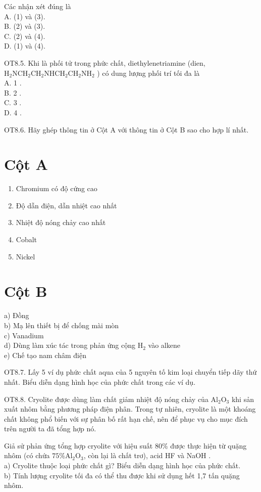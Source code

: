 \documentclass[10pt]{article}
\begin{document}
Các nhận xét đúng là\\
A. (1) và (3).\\
B. (2) và (3).\\
C. (2) và (4).\\
D. (1) và (4).

OT8.5. Khi là phối tử trong phức chất, diethylenetriamine (dien, $\mathrm{H}_{2} \mathrm{NCH}_{2} \mathrm{CH}_{2} \mathrm{NHCH}_{2} \mathrm{CH}_{2} \mathrm{NH}_{2}$ ) có dung lượng phối trí tối đa là\\
A. 1 .\\
B. 2 .\\
C. 3 .\\
D. 4 .

OT8.6. Hãy ghép thông tin ở Cột A với thông tin ở Cột B sao cho hợp lí nhất.

\section*{Cột A}
\begin{enumerate}
  \item Chromium có độ cứng cao
  \item Độ dẫn điện, dẫn nhiệt cao nhất
  \item Nhiệt độ nóng chảy cao nhất
  \item Cobalt
  \item Nickel
\end{enumerate}

\section*{Cột B}
a) Đồng\\
b) Mạ lên thiết bị để chống mài mòn\\
c) Vanadium\\
d) Dùng làm xúc tác trong phản ứng cộng $\mathrm{H}_{2}$ vào alkene\\
e) Chế tạo nam châm điện

OT8.7. Lấy 5 ví dụ phức chất aqua của 5 nguyên tố kim loại chuyển tiếp dãy thứ nhất. Biểu diễn dạng hình học của phức chất trong các ví dụ.

OT8.8. Cryolite được dùng làm chất giảm nhiệt độ nóng chảy của $\mathrm{Al}_{2} \mathrm{O}_{3}$ khi sản xuất nhôm bằng phương pháp điện phân. Trong tự nhiên, cryolite là một khoáng chất không phổ biến với sự phân bố rất hạn chế, nên để phục vụ cho mục đích trên người ta đã tổng hợp nó.

Giả sử phản ứng tổng hợp cryolite với hiệu suất $80 \%$ được thực hiện từ quặng nhôm (có chứa $75 \% \mathrm{Al}_{2} \mathrm{O}_{3}$, còn lại là chất trơ), acid HF và NaOH .\\
a) Cryolite thuộc loại phức chất gì? Biểu diễn dạng hình học của phức chất.\\
b) Tính lượng cryolite tối đa có thể thu được khi sử dụng hết 1,7 tấn quặng nhôm.
\end{document}
